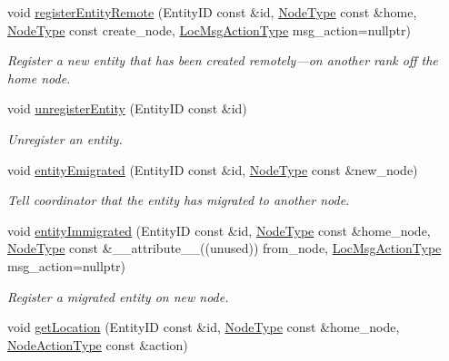 \begin{DoxyCompactItemize}
void \hyperlink{structvt_1_1location_1_1_entity_location_coord_a0d3a9a66cddeb6929ed8452a02ba7681}{register\+Entity\+Remote} (Entity\+ID const \&id, \hyperlink{namespacevt_a866da9d0efc19c0a1ce79e9e492f47e2}{Node\+Type} const \&home, \hyperlink{namespacevt_a866da9d0efc19c0a1ce79e9e492f47e2}{Node\+Type} const create\+\_\+node, \hyperlink{namespacevt_1_1location_ad0a130e4d79e745543925240e13e8f08}{Loc\+Msg\+Action\+Type} msg\+\_\+action=nullptr)
\begin{DoxyCompactList}\small\item\em Register a new entity that has been created remotely---on another rank off the home node. \end{DoxyCompactList}\item 
void \hyperlink{structvt_1_1location_1_1_entity_location_coord_a076ec3a6b06e74567e7281adb0645cd7}{unregister\+Entity} (Entity\+ID const \&id)
\begin{DoxyCompactList}\small\item\em Unregister an entity. \end{DoxyCompactList}\item 
void \hyperlink{structvt_1_1location_1_1_entity_location_coord_a770fca228907ff6f818ab184d7580a5e}{entity\+Emigrated} (Entity\+ID const \&id, \hyperlink{namespacevt_a866da9d0efc19c0a1ce79e9e492f47e2}{Node\+Type} const \&new\+\_\+node)
\begin{DoxyCompactList}\small\item\em Tell coordinator that the entity has migrated to another node. \end{DoxyCompactList}\item 
void \hyperlink{structvt_1_1location_1_1_entity_location_coord_a67df1eb9ae48ef4b181dafda9ae3ff71}{entity\+Immigrated} (Entity\+ID const \&id, \hyperlink{namespacevt_a866da9d0efc19c0a1ce79e9e492f47e2}{Node\+Type} const \&home\+\_\+node, \hyperlink{namespacevt_a866da9d0efc19c0a1ce79e9e492f47e2}{Node\+Type} const \&\+\_\+\+\_\+attribute\+\_\+\+\_\+((unused)) from\+\_\+node, \hyperlink{namespacevt_1_1location_ad0a130e4d79e745543925240e13e8f08}{Loc\+Msg\+Action\+Type} msg\+\_\+action=nullptr)
\begin{DoxyCompactList}\small\item\em Register a migrated entity on new node. \end{DoxyCompactList}\item 
void \hyperlink{structvt_1_1location_1_1_entity_location_coord_a129f501be83c7fceb47466c34d733248}{get\+Location} (Entity\+ID const \&id, \hyperlink{namespacevt_a866da9d0efc19c0a1ce79e9e492f47e2}{Node\+Type} const \&home\+\_\+node, \hyperlink{namespacevt_1_1location_a3a9235e0ceb341bef225d2cc46606e9e}{Node\+Action\+Type} const \&action)

\end{DoxyCompactItemize}
